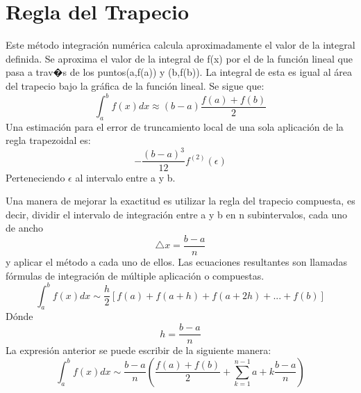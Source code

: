 


\section{Regla del Trapecio}
\label{2:sec:1}
\parindent=0.5cm
\raggedright
Este método integración numérica calcula aproximadamente el valor de la integral definida. 
Se aproxima el valor de la integral de f(x) por el de la función lineal que pasa 
a trav�s de los puntos(a,f(a)) y (b,f(b)). La integral de esta es igual al área del 
trapecio bajo la gráfica de la función lineal. Se sigue que: 
\[
\int_{a}^{b} f(x)dx \approx\left(b-a\right)\frac{f(a)+f(b)}{2} 
\]
Una estimación para el error de truncamiento local de una sola aplicación de la regla trapezoidal es:
\[
-\frac{\left(b-a\right)^3}{12}  \displaystyle f^{(2)}(\epsilon)
\]
Perteneciendo $\epsilon$ al intervalo entre a y b.


\parindent=0.5cm
\raggedright
Una manera de mejorar la exactitud es utilizar la regla del trapecio compuesta, es decir, dividir
el intervalo de integración entre a y b en n subintervalos, cada uno de ancho
\[
\bigtriangleup{x}=\frac{b-a}{n}
\]
y aplicar el método a cada uno de ellos. Las ecuaciones resultantes son llamadas fórmulas
de integración de múltiple aplicación o compuestas.
\[
\int_{a}^{b} f(x)dx \sim\frac{h}{2}\left[f(a) + f(a+h) + f(a+2h) + ... + f(b)\right]
\]
Dónde 
\[
h=\frac{b-a}{n} 
\]
La expresión anterior se puede escribir de la siguiente manera:
\[
\int_{a}^{b} f(x)dx \sim\frac{b-a}{n}\left(\frac{f(a)+f(b)}{2} + \sum_{k=1}^{n-1} a+k\frac{b-a}{n} \right)
\]
